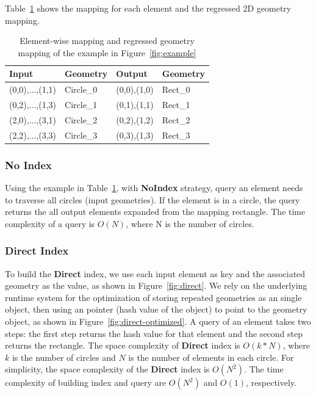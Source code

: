 \documentclass{sig-alternate}
\begin{document}
Table~\ref{tb:example} shows the mapping for each element and the regressed 2D geometry mapping.
\begin{table}[ht]
\begin{center}
    \caption{Element-wise mapping and regressed geometry mapping of the example in Figure~\ref{fig:example}}
    \begin{scriptsize}
    \begin{tabular}{ | p{1.75cm} | p{1.75cm} | p{1.75cm} | p{1.75cm} |}
    \hline
    Input & Geometry & Output & Geometry \\ \hline \hline
    (0,0),...,(1,1) & Circle\_0 & (0,0),(1,0) & Rect\_0 \\ \hline
    (0,2),...,(1,3) & Circle\_1 & (0,1),(1,1) & Rect\_1 \\ \hline
    (2,0),...,(3,1) & Circle\_2 & (0,2),(1,2) & Rect\_2 \\ \hline
    (2,2),...,(3,3) & Circle\_3 & (0,3),(1,3) & Rect\_3 \\ \hline
    \end{tabular}
    \end{scriptsize}
    \label{tb:example}
\end{center}   
\end{table} 

\subsubsection{No Index}
Using the example in Table~\ref{tb:example}, with {\bf NoIndex} strategy, query an element needs to traverse all circles (input geometries).
If the element is in a circle, the query returns the all output elements expanded from the mapping rectangle.
The time complexity of a query is $O(N)$, where N is the number of circles. 

\subsubsection{Direct Index}
To build the {\bf Direct} index, we use each input element as key and the associated geometry as the value, as shown in Figure~\ref{fig:direct}.
We rely on the underlying runtime system for the optimization of storing repeated geometries as an single object,
then using an pointer (hash value of the object) to point to the geometry object, as shown in Figure~\ref{fig:direct-optimized}.
A query of an element takes two steps: the first step returns the hash value for that element and the second step returns the rectangle. 
The space complexity of {\bf Direct} index is $O(k*N)$, where $k$ is the number of circles and $N$ is the number of elements in each circle.
For simplicity, the space complexity of the {\bf Direct} index is $O(N^2)$.
The time complexity of building index and query are $O(N^2)$ and $O(1)$, respectively.
\end{document}
